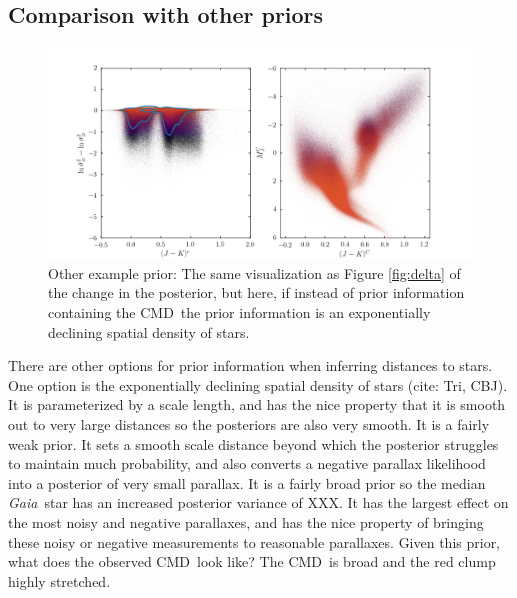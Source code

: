 \documentclass[modern]{aastex61}
\newcommand{\acronym}[1]{{\small{#1}}}
\newcommand{\project}[1]{\textsl{#1}}
\newcommand{\gaia}{\project{Gaia}}
\newcommand{\cmd}{\acronym{CMD}}
\begin{document}
\subsection{Comparison with other priors}
\begin{figure}
\centering
  \includegraphics[width=\textwidth]{deltaSimple.png}
\caption{Other example prior: The same visualization as Figure \ref{fig:delta} of the change in the posterior, but here, if instead of prior information containing the \cmd\, the prior information is an exponentially declining spatial density of stars.  }
\label{fig:otherPrior}
\end{figure}

There are other options for prior information when inferring distances to stars. One option is the exponentially declining spatial density of stars (cite: Tri, CBJ). It is parameterized by a scale length, and has the nice property that it is smooth out to very large distances so the posteriors are also very smooth. It is a fairly weak prior. It sets a smooth scale distance beyond which the posterior struggles to maintain much probability, and also converts a negative parallax likelihood into a posterior of very small parallax. It is a fairly broad prior so the median \gaia\ star has an increased posterior variance of XXX. It has the largest effect on the most noisy and negative parallaxes, and has the nice property of bringing these noisy or negative measurements to reasonable parallaxes. Given this prior, what does the observed \cmd\ look like?  The \cmd\ is broad and the red clump highly stretched.
\end{document}
